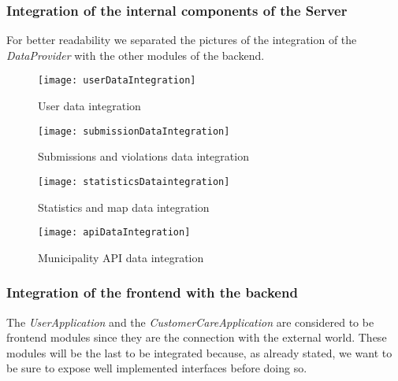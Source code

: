         \subsubsection{Integration of the internal components of the Server}
            
            For better readability we separated the pictures of the integration of the \emph{DataProvider} with the other modules of the backend.\\

            \begin{figure}[h]
                \centering
                \texttt{[image: userDataIntegration]}
                \caption{
                    \label{fig:userDataIntegration} 
                    User data integration
                }
            \end{figure}
            
            \begin{figure}[h]
                \centering
                \texttt{[image: submissionDataIntegration]}
                \caption{
                    \label{fig:submissionDataIntegration} 
                    Submissions and violations data integration
                }
            \end{figure}
            
            \begin{figure}[h]
                \centering
                \texttt{[image: statisticsDataintegration]}
                \caption{
                    \label{fig:statisticsDataIntegration} 
                    Statistics and map data integration
                }
            \end{figure}
             
            \begin{figure}[h]
                \centering
                \texttt{[image: apiDataIntegration]}
                \caption{
                    \label{fig:apiDataIntegration} 
                    Municipality API data integration
                }
            \end{figure}
            \clearpage

        \subsubsection{Integration of the frontend with the backend}
            
            The \emph{UserApplication} and the \emph{CustomerCareApplication} are considered to be frontend modules 
            since they are the connection with the external world. These modules will be the last to be integrated because, 
            as already stated, we want to be sure to expose well implemented interfaces before doing so.\\

